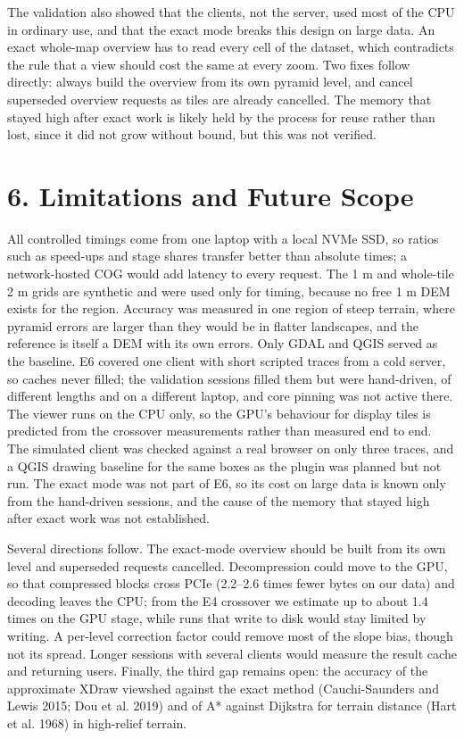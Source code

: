 \documentclass[10pt,a4paper]{article}
\begin{document}
The validation also showed that the clients, not the server, used most of the CPU in ordinary use, and that the exact mode breaks this design on large data. An exact whole-map overview has to read every cell of the dataset, which contradicts the rule that a view should cost the same at every zoom. Two fixes follow directly: always build the overview from its own pyramid level, and cancel superseded overview requests as tiles are already cancelled. The memory that stayed high after exact work is likely held by the process for reuse rather than lost, since it did not grow without bound, but this was not verified.

\section*{6. Limitations and Future Scope}
All controlled timings come from one laptop with a local NVMe SSD, so ratios such as speed-ups and stage shares transfer better than absolute times; a network-hosted COG would add latency to every request. The 1 m and whole-tile 2 m grids are synthetic and were used only for timing, because no free 1 m DEM exists for the region. Accuracy was measured in one region of steep terrain, where pyramid errors are larger than they would be in flatter landscapes, and the reference is itself a DEM with its own errors. Only GDAL and QGIS served as the baseline. E6 covered one client with short scripted traces from a cold server, so caches never filled; the validation sessions filled them but were hand-driven, of different lengths and on a different laptop, and core pinning was not active there. The viewer runs on the CPU only, so the GPU's behaviour for display tiles is predicted from the crossover measurements rather than measured end to end. The simulated client was checked against a real browser on only three traces, and a QGIS drawing baseline for the same boxes as the plugin was planned but not run. The exact mode was not part of E6, so its cost on large data is known only from the hand-driven sessions, and the cause of the memory that stayed high after exact work was not established.

Several directions follow. The exact-mode overview should be built from its own level and superseded requests cancelled. Decompression could move to the GPU, so that compressed blocks cross PCIe (2.2--2.6 times fewer bytes on our data) and decoding leaves the CPU; from the E4 crossover we estimate up to about 1.4 times on the GPU stage, while runs that write to disk would stay limited by writing. A per-level correction factor could remove most of the slope bias, though not its spread. Longer sessions with several clients would measure the result cache and returning users. Finally, the third gap remains open: the accuracy of the approximate XDraw viewshed against the exact method (Cauchi-Saunders and Lewis 2015; Dou et al. 2019) and of A* against Dijkstra for terrain distance (Hart et al. 1968) in high-relief terrain.
\end{document}
